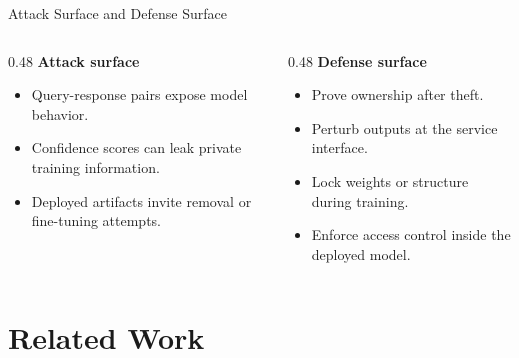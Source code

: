 \documentclass{beamer}
\begin{document}
\begin{frame}{Attack Surface and Defense Surface}
    \begin{columns}[T,totalwidth=\textwidth]
        \begin{column}{0.48\textwidth}
            \textbf{Attack surface}
            \small
            \begin{itemize}
                \setlength\itemsep{0.22cm}
                \item Query-response pairs expose model behavior.
                \item Confidence scores can leak private training information.
                \item Deployed artifacts invite removal or fine-tuning attempts.
            \end{itemize}
        \end{column}
        \begin{column}{0.48\textwidth}
            \textbf{Defense surface}
            \small
            \begin{itemize}
                \setlength\itemsep{0.22cm}
                \item Prove ownership after theft.
                \item Perturb outputs at the service interface.
                \item Lock weights or structure during training.
                \item Enforce access control inside the deployed model.
            \end{itemize}
        \end{column}
    \end{columns}
    \vspace{0.2cm}

\end{frame}

\section{Related Work}
\end{document}
